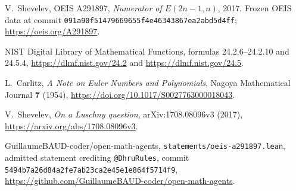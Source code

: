 V.~Shevelev, OEIS A291897, \emph{Numerator of $E(2n-1,n)$}, 2017.
Frozen OEIS data at commit \texttt{091a90f51479669655f4e46343867ea2abd5d4ff};
\url{https://oeis.org/A291897}.

NIST Digital Library of Mathematical Functions,
formulas 24.2.6--24.2.10 and 24.5.4,
\url{https://dlmf.nist.gov/24.2} and \url{https://dlmf.nist.gov/24.5}.

L.~Carlitz, \emph{A Note on Euler Numbers and Polynomials},
Nagoya Mathematical Journal \textbf{7} (1954),
\url{https://doi.org/10.1017/S0027763000018043}.

V.~Shevelev, \emph{On a Luschny question}, arXiv:1708.08096v3 (2017),
\url{https://arxiv.org/abs/1708.08096v3}.

GuillaumeBAUD-coder/open-math-agents,
\texttt{statements/oeis-a291897.lean}, admitted statement crediting
\texttt{@DhruRules}, commit
\texttt{5494b7a26d84a2fe7ab23ca2e45e1e864f5714f9},
\url{https://github.com/GuillaumeBAUD-coder/open-math-agents}.
